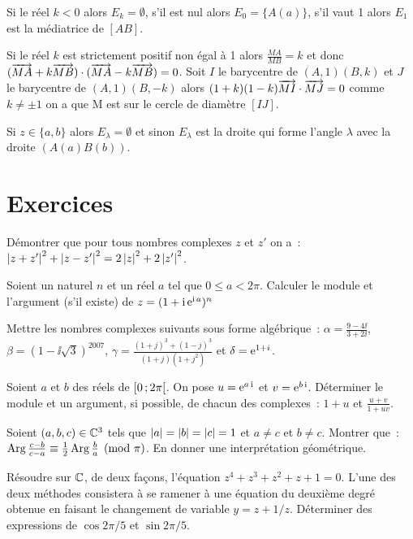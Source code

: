 Si le réel \(k<0\) alors \(E_k=\emptyset\), s'il est nul alors \(E_0=\{A(a)\}\), s'il vaut 1 alors \(E_1\) est la médiatrice de \([AB]\).

Si le réel \(k\) est strictement positif non égal à 1 alors \(\frac{MA}{MB}=k\) et donc \((\overrightarrow{MA}+k\overrightarrow{MB}) \cdot (\overrightarrow{MA}-k\overrightarrow{MB})=0\). Soit \(I\) le barycentre de \((A,1)(B,k)\) et \(J\) le barycentre de \((A,1)(B,-k)\) alors \((1+k)(1-k) \overrightarrow{MI} \cdot \overrightarrow{MJ} =0\) comme \(k \neq \pm 1\) on a que M est sur le cercle de diamètre \([IJ]\).

Si \(z \in \{a,b\}\) alors \(E_\lambda=\emptyset\) et sinon \(E_\lambda\) est la droite qui forme l'angle \(\lambda\) avec la droite \((A(a)B(b))\).
\cleardoublepage
\section{Exercices}
\begin{exercice}
    Démontrer que pour tous nombres complexes \(z\) et \(z'\) on a~:\(\left\lvert z+z'\right\rvert^2 + \left\lvert z-z'\right\rvert^2 = 2\left\lvert z\right\rvert^2 + 2\left\lvert z'\right\rvert^2\).
\end{exercice}
\begin{exercice}
    Soient un naturel \(n\) et un réel \(a\) tel que \(0 \leqslant a < 2\pi\). Calculer le module et l'argument (s'il existe) de \(z = (1+\operatorname{i}\operatorname{e}^{\operatorname{i} a})^n\)
\end{exercice}
\begin{exercice}
    Mettre les nombres complexes suivants sous forme algébrique~: \(\alpha = \frac{9-4\ii}{3+2\ii}\), \(\beta=(1-\ii\sqrt{3})^{2007}\), \(\gamma = \frac{(1+j)^3+(1-j)^3}{(1+j)(1+j^2)}\) et \( \delta = \operatorname{e}^{1+i}\).
\end{exercice}
\begin{exercice}
    Soient \(a\) et \(b\) des réels de \(\left[ 0 \, ;  2\pi \right[\). On pose \(u=\operatorname{e}^{a\operatorname{i}}\) et \(v=\operatorname{e}^{b\operatorname{i}}\). Déterminer le module et un argument, si possible, de chacun des complexes~: \(1+u\) et \(\frac{u+v}{1+uv}\).
\end{exercice}
\begin{exercice}
    Soient \((a, b, c) \in \mathbb{C}^3\) tels que \(\left\lvert a\right\rvert=\left\lvert b\right\rvert=\left\lvert c\right\rvert=1\) et \(a \neq c\) et \(b \neq c\). Montrer que~:\(\operatorname{Arg} \frac{c-b}{c-a} \equiv \frac{1}{2} \operatorname{Arg} \frac{b}{a} \pmod \pi\). En donner une interprétation géométrique.
\end{exercice}
\begin{exercice}
    Résoudre sur \(\mathbb{C}\), de deux façons, l'équation \(z^4+z^3+z^2+z+1=0\). L'une des deux méthodes consistera à se ramener à une équation du deuxième degré obtenue en faisant le changement de variable \(y = z+1/z\). Déterminer des expressions de \(\cos 2\pi/5\) et \(\sin 2\pi/5\).
\end{exercice}
